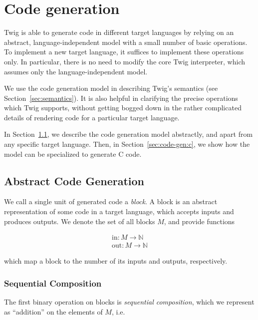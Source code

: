 
\section{Code generation}
\label{sec:code-gen}

Twig is able to generate code in different target languages by
relying on an abstract, language-independent model with a small
number of basic operations. To implement a new target language, it
suffices to implement these operations only. In particular, there
is no need to modify the core Twig interpreter, which assumes only
the language-independent model.

We use the code generation model in describing Twig's semantics
(see Section~\ref{sec:semantics}). It is also helpful in
clarifying the precise operations which Twig supports, without
getting bogged down in the rather complicated details of rendering
code for a particular target language.

In Section~\ref{sec:code-gen:abstract}, we describe the code
generation model abstractly, and apart from any specific target
language. Then, in Section~\ref{sec:code-gen:c}, we show how the
model can be specialized to generate C code.

\subsection{Abstract Code Generation}
\label{sec:code-gen:abstract}

We call a single unit of generated code a \emph{block}. A block is
an abstract representation of some code in a target language,
which accepts inputs and produces outputs. We denote the 
set of all blocks $M$, and provide functions 

\begin{eqnarray*}
\mbox{in} : M \to \mathbb{N}\\
\mbox{out} : M \to \mathbb{N}
\end{eqnarray*}

which map a block to the number of its inputs and outputs,
respectively.

\subsubsection{Sequential Composition}
\label{sec:code-gen:seq}

The first binary operation on blocks is \emph{sequential
composition}, which we represent as ``addition'' on the elements
of $M$, i.e.


